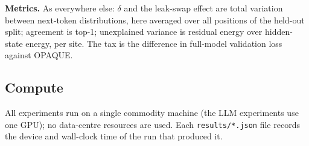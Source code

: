 \documentclass[11pt]{article}
\begin{document}
\textbf{Metrics.} As everywhere else: $\delta$ and the leak-swap effect are total
variation between next-token distributions, here averaged over all positions of the
held-out split; agreement is top-1; unexplained variance is residual energy over
hidden-state energy, per site. The tax is the difference in full-model validation
loss against OPAQUE.

\subsection{Compute}
All experiments run on a single commodity machine (the LLM experiments use one GPU);
no data-centre resources are used. Each \texttt{results/*.json} file records the
device and wall-clock time of the run that produced it.
\end{document}
